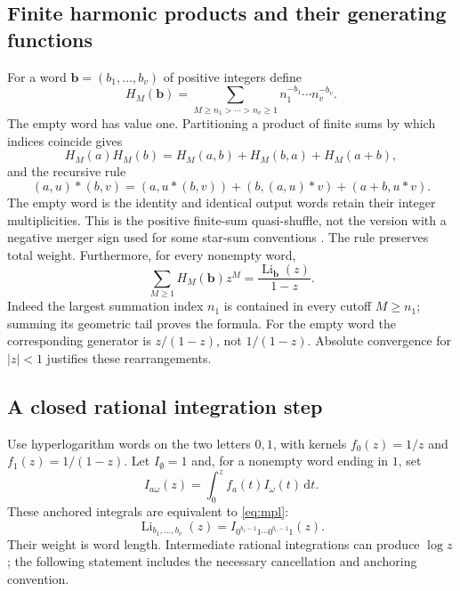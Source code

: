 \documentclass[11pt,letterpaper]{article}
\numberwithin{equation}{section}
\theoremstyle{definition}\newtheorem{definition}[theorem]{Definition}
\theoremstyle{remark}\newtheorem{remark}[theorem]{Remark}
\newcommand{\dd}{\,\mathrm d}\newcommand{\Li}{\operatorname{Li}}
\begin{document}
\subsection{Finite harmonic products and their generating functions}

For a word $\mathbf b=(b_1,\ldots,b_v)$ of positive integers define
\[
 H_M(\mathbf b)=\sum_{M\ge n_1>\cdots>n_v\ge1}
                        n_1^{-b_1}\cdots n_v^{-b_v}.
\]
The empty word has value one. Partitioning a product of finite sums by
which indices coincide gives
\begin{equation}\label{eq:stuffle}
 H_M(a)H_M(b)=H_M(a,b)+H_M(b,a)+H_M(a+b),
\end{equation}
and the recursive rule
\begin{equation}\label{eq:stufflerec}
 (a,u)*(b,v)=(a,u*(b,v))+(b,(a,u)*v)+(a+b,u*v).
\end{equation}
The empty word is the identity and identical output words retain their
integer multiplicities. This is the positive finite-sum quasi-shuffle,
not the version with a negative merger sign used for some star-sum
conventions \cite{hoffman}. The rule preserves total weight.
Furthermore, for every nonempty word,
\begin{equation}\label{eq:hgen}
 \sum_{M\ge1}H_M(\mathbf b)z^M
               =\frac{\Li_{\mathbf b}(z)}{1-z}.
\end{equation}
Indeed the largest summation index $n_1$ is contained in every cutoff
$M\ge n_1$; summing its geometric tail proves the formula. For the empty
word the corresponding generator is $z/(1-z)$, not $1/(1-z)$.
Absolute convergence for $|z|<1$ justifies these rearrangements.

\subsection{A closed rational integration step}

Use hyperlogarithm words on the two letters $0,1$, with kernels
$f_0(z)=1/z$ and $f_1(z)=1/(1-z)$. Let $I_\emptyset=1$ and, for a
nonempty word ending in $1$, set
\[
 I_{a\omega}(z)=\int_0^z f_a(t)I_\omega(t)\dd t.
\]
These anchored integrals are equivalent to \eqref{eq:mpl}:
\begin{equation}\label{eq:words}
 \Li_{b_1,\ldots,b_v}(z)=
 I_{0^{b_1-1}1\cdots0^{b_v-1}1}(z).
\end{equation}
Their weight is word length. Intermediate rational integrations can
produce $\log z$; the following statement includes the necessary
cancellation and anchoring convention.
\end{document}
